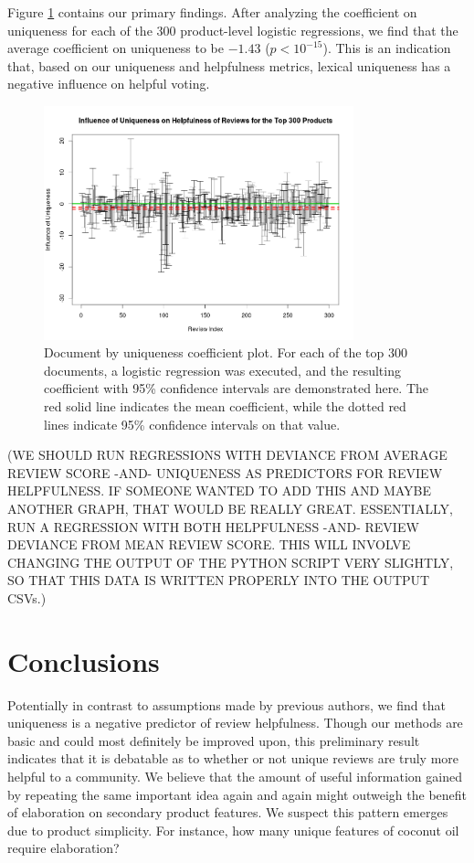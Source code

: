 \documentclass[10pt]{article}
\begin{document}
Figure \ref{fig:result} contains our primary findings. After analyzing the coefficient on uniqueness for each of the 300 product-level logistic regressions, we find that the average coefficient on uniqueness to be $-1.43$ ($p < 10^{-15}$). This is an indication that, based on our uniqueness and helpfulness metrics, lexical uniqueness has a negative influence on helpful voting. 

\begin{figure}[h!]
  \centering
  \includegraphics[width=0.8\textwidth]{influence.png}
  \caption{Document by uniqueness coefficient plot. For each of the top 300 documents, a logistic regression was executed, and the resulting coefficient with 95\% confidence intervals are demonstrated here. The red solid line indicates the mean coefficient, while the dotted red lines indicate 95\% confidence intervals on that value.}
  \label{fig:result}
\end{figure}


(WE SHOULD RUN REGRESSIONS WITH DEVIANCE FROM AVERAGE REVIEW SCORE -AND- UNIQUENESS AS PREDICTORS FOR REVIEW HELPFULNESS. IF SOMEONE WANTED TO ADD THIS AND MAYBE ANOTHER GRAPH, THAT WOULD BE REALLY GREAT. ESSENTIALLY, RUN A REGRESSION WITH BOTH HELPFULNESS -AND- REVIEW DEVIANCE FROM MEAN REVIEW SCORE. THIS WILL INVOLVE CHANGING THE OUTPUT OF THE PYTHON SCRIPT VERY SLIGHTLY, SO THAT THIS DATA IS WRITTEN PROPERLY INTO THE OUTPUT CSVs.)


\section*{Conclusions}
Potentially in contrast to assumptions made by previous authors, we find that uniqueness is a negative predictor of review helpfulness. Though our methods are basic and could most definitely be improved upon, this preliminary result indicates that it is debatable as to whether or not unique reviews are truly more helpful to a community. We believe that the amount of useful information gained by repeating the same important idea again and again might outweigh the benefit of elaboration on secondary product features. We suspect this pattern emerges due to product simplicity. For instance, how many unique features of coconut oil require elaboration?
\end{document}
